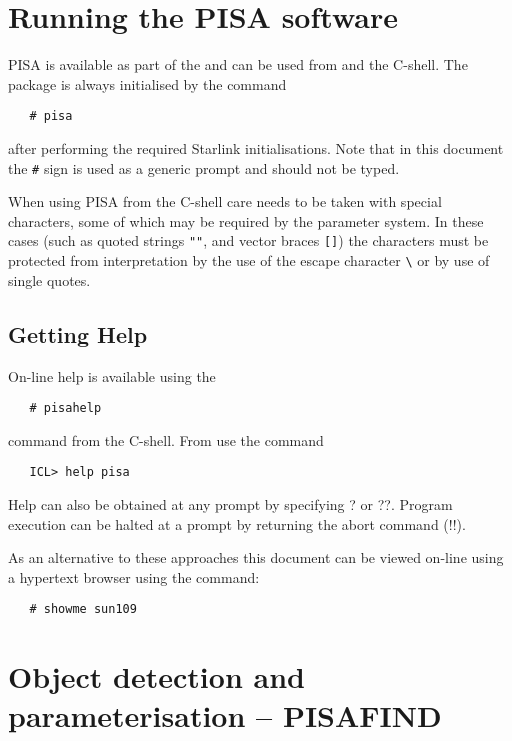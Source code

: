 \section{Running the PISA software}

PISA is available as part of the
and can be used from  and the C-shell. The package is always
initialised by the command
\begin{verbatim}
   # pisa
\end{verbatim}

after performing the required Starlink initialisations. Note that in this
document the \verb+#+ sign is used as a generic prompt and should not be typed.

When using PISA from the C-shell care needs to be taken with special
characters, some of which may be required by the parameter system. In
these cases (such as quoted strings \verb+""+, and vector braces
\verb+[]+) the characters must be protected from interpretation by the
use of the escape character \verb+\+ or by use of single quotes.

\subsection{Getting Help}

On-line help is available using the
\begin{verbatim}
   # pisahelp
\end{verbatim}
command from the C-shell. From  use the command
\begin{verbatim}
   ICL> help pisa
\end{verbatim}
Help can also be obtained at any prompt by specifying ? or ??. Program
execution can be halted at a prompt by returning the abort command (!!).

\begin{latexonly}
As an alternative to these approaches this document can be viewed
on-line using a hypertext browser using the command:
\begin{verbatim}
   # showme sun109
\end{verbatim}
\end{latexonly}

\section{Object detection and parameterisation -- PISAFIND}

